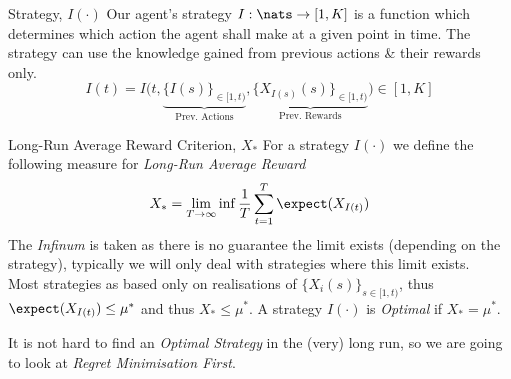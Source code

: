 \documentclass[11pt,a4paper]{article}
\begin{document}
  \begin{definition}{Strategy, $I(\cdot)$}
    Our agent's strategy $I:\nats\to[1,K]$ is a function which determines which action the agent shall make at a given point in time. The strategy can use the knowledge gained from previous actions \& their rewards only.
    \[ I(t)=I\big(t,\underbrace{\{I(s)\}_{\in[1,t)}}_\text{Prev. Actions},\underbrace{\{X_{I(s)}(s)\}_{\in[1,t)}}_\text{Prev. Rewards}\big)\in[1,K] \]
  \end{definition}

  \begin{definition}{Long-Run Average Reward Criterion, $X_*$}
    For a strategy $I(\cdot)$ we define the following measure for \textit{Long-Run Average Reward}
    \[ {\displaystyle X_*=\lim_{T\to\infty}\inf\frac1T\sum_{t=1}^T\expect(X_{I(t)})} \]
    The \textit{Infinum} is taken as there is no guarantee the limit exists (depending on the strategy), typically we will only deal with strategies where this limit exists.\\
    Most strategies as based only on realisations of $\{X_i(s)\}_{s\in[1,t)}$, thus $\expect(X_{I(t)})\leq\mu^*$ and thus $X_*\leq\mu^*$. A strategy $I(\cdot)$ is \textit{Optimal} if $X_*=\mu^*$.
  \end{definition}

  \begin{remark}{It is not hard to find an \textit{Optimal Strategy} in the (very) long run, so we are going to look at \textit{Regret Minimisation First}.}
  \end{remark}
\end{document}
